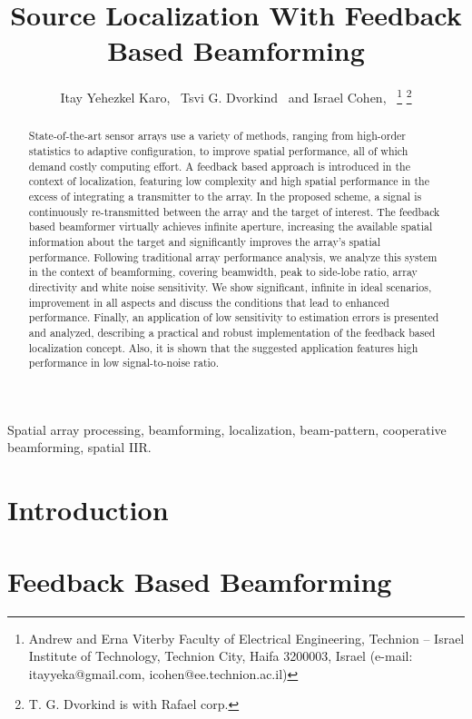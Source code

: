 \documentclass[journal]{IEEEtran}
\begin{document}
\title{Source Localization With Feedback Based Beamforming}
\author{Itay Yehezkel Karo,~\IEEEmembership{}
        Tsvi G. Dvorkind~\IEEEmembership{}
        and 
        Israel Cohen,~
\thanks{Andrew and Erna Viterby Faculty of Electrical Engineering, Technion -- Israel Institute of Technology, Technion City, Haifa 3200003, Israel (e-mail: itayyeka@gmail.com, icohen@ee.technion.ac.il)}%
\thanks{T. G. Dvorkind is with Rafael corp.}%
}
\markboth{}%
{}
\maketitle
\begin{abstract}
State-of-the-art sensor arrays use a variety of methods, ranging from high-order statistics to adaptive configuration, to improve spatial performance, all of which demand costly computing effort.
A feedback based approach is introduced in the context of localization, featuring low complexity and high spatial performance in the excess of integrating a transmitter to the array.  
In the proposed scheme, a signal is continuously re-transmitted between the array and the target of interest.
The feedback based beamformer virtually achieves infinite aperture, increasing the available spatial information about the target and significantly improves the array's spatial performance.
Following traditional array performance analysis, we analyze this system in the context of beamforming, covering beamwidth, peak to side-lobe ratio, array directivity and white noise sensitivity. 
We show significant, infinite in ideal scenarios, improvement in all aspects and discuss the conditions that lead to enhanced performance.
Finally, an application of low sensitivity to estimation errors is presented and analyzed, describing a practical and robust implementation of the feedback based localization concept. 
Also, it is shown that the suggested application features high performance in low signal-to-noise ratio.  
\end{abstract}
\begin{IEEEkeywords}
Spatial array processing, beamforming, localization, beam-pattern, cooperative beamforming, spatial IIR.
\end{IEEEkeywords}
\section{Introduction}

\section{Feedback Based Beamforming}
\label{sec_introduceFeedback}

\end{document}
